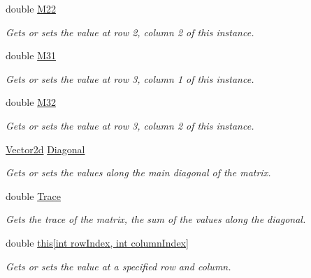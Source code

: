 \begin{DoxyCompactItemize}
double \hyperlink{struct_open_t_k_1_1_matrix3x2d_a402c9a6d2b57c42b46c5ddb65c82f272}{M22}
\begin{DoxyCompactList}\small\item\em Gets or sets the value at row 2, column 2 of this instance. \end{DoxyCompactList}\item 
double \hyperlink{struct_open_t_k_1_1_matrix3x2d_a380ae1743858e3ba466796bf424840f3}{M31}
\begin{DoxyCompactList}\small\item\em Gets or sets the value at row 3, column 1 of this instance. \end{DoxyCompactList}\item 
double \hyperlink{struct_open_t_k_1_1_matrix3x2d_ad49bb750b4990921812f9edce75d8dd2}{M32}
\begin{DoxyCompactList}\small\item\em Gets or sets the value at row 3, column 2 of this instance. \end{DoxyCompactList}\item 
\hyperlink{struct_open_t_k_1_1_vector2d}{Vector2d} \hyperlink{struct_open_t_k_1_1_matrix3x2d_a058d205a9f8cd389ae9d98453598ee86}{Diagonal}
\begin{DoxyCompactList}\small\item\em Gets or sets the values along the main diagonal of the matrix. \end{DoxyCompactList}\item 
double \hyperlink{struct_open_t_k_1_1_matrix3x2d_a3a88c62273705c9560551c07b2f670c7}{Trace}
\begin{DoxyCompactList}\small\item\em Gets the trace of the matrix, the sum of the values along the diagonal. \end{DoxyCompactList}\item 
double \hyperlink{struct_open_t_k_1_1_matrix3x2d_afd2d46fce0842b8e16cc6b21f62b8154}{this\mbox{[}int row\-Index, int column\-Index\mbox{]}}
\begin{DoxyCompactList}\small\item\em Gets or sets the value at a specified row and column. \end{DoxyCompactList}\end{DoxyCompactItemize}


